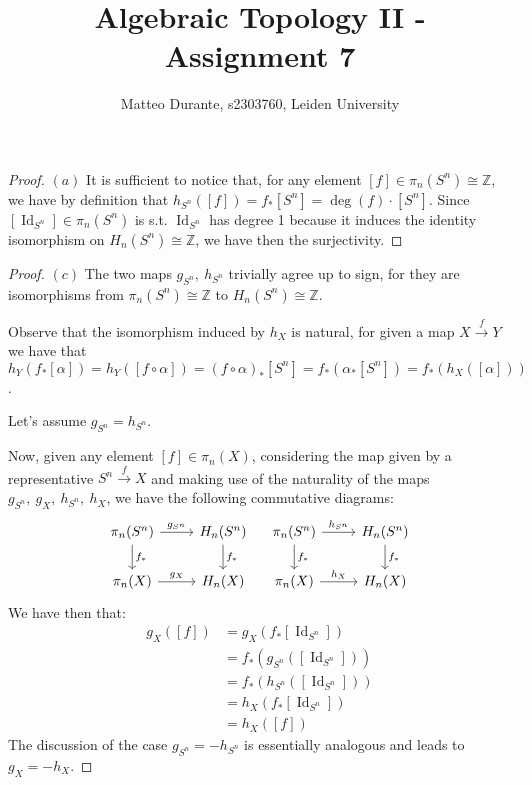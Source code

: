 \documentclass{article}
\newcommand{\numberset}{\mathbb}
\newcommand{\Z}{\numberset{Z}}
\newcommand{\exercise}[1]{\noindent {\bf Exercise #1}}
\DeclareMathOperator{\Id}{Id}
\begin{document}
\title{Algebraic Topology II - Assignment 7}

\author{Matteo Durante, s2303760, Leiden University}

\maketitle

\exercise{2}

\begin{proof}
    $(a)$ It is sufficient to notice that, for any element
    $[f]\in\pi_n(S^n)\cong\Z$, we have by definition that
    $h_{S^n}([f])=f_*[S^n]=\deg(f)\cdot [S^n]$. Since
    $[\Id_{S^n}]\in\pi_n(S^n)$ is s.t. $\Id_{S^n}$ has degree 1 because it
    induces the identity isomorphism on $H_n(S^n)\cong\Z$, we have then the
    surjectivity.
\end{proof}

\begin{proof}
    $(c)$ The two maps $g_{S^n},\ h_{S^n}$ trivially agree up to sign, for they
    are isomorphisms from $\pi_n(S^n)\cong\Z$ to $H_n(S^n)\cong\Z$.

    Observe that the isomorphism induced by $h_X$ is natural, for given a map
    $X\xrightarrow{f} Y$ we have that
    $h_Y(f_*[\alpha])=h_Y([f\circ\alpha])=(f\circ\alpha)_*[S^n]=
    f_*(\alpha_*[S^n])=f_*(h_X([\alpha]))$.

    Let's assume $g_{S^n}=h_{S^n}$.

    Now, given any element $[f]\in\pi_n(X)$, considering the map given by a
    representative $S^n\xrightarrow{f}X$ and making use of the naturality of the
    maps $g_{S^n},\ g_X,\ h_{S^n},\ h_X$, we have the following commutative
    diagrams:
    \[
        \begin{tikzcd}
            \pi_n(S^n)\arrow{r}{g_{S^n}}\arrow{d}{f_*}
            & H_n(S^n)\arrow{d}{f_*} \\
            \pi_n(X)\arrow{r}{g_X}
            & H_n(X)
        \end{tikzcd}
        \quad
        \begin{tikzcd}
            \pi_n(S^n)\arrow{r}{h_{S^n}}\arrow{d}{f_*}
            & H_n(S^n)\arrow{d}{f_*} \\
            \pi_n(X)\arrow{r}{h_X}
            & H_n(X)
        \end{tikzcd}
    \]
    We have then that:
    \begin{align*}
        g_X([f]) &=g_X(f_*[\Id_{S^n}]) \\
        &=f_*(g_{S^n}([\Id_{S^n}])) \\
        &=f_*(h_{S^n}([\Id_{S^n}])) \\
        &=h_X(f_*[\Id_{S^n}]) \\
        &=h_X([f])
    \end{align*}
    The discussion of the case $g_{S^n}=-h_{S^n}$ is essentially analogous and
    leads to $g_X=-h_X$.
\end{proof}
\end{document}
